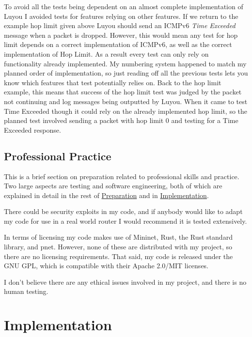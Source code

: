 \documentclass[12pt,a4paper,twoside,openright]{report}
\begin{document}
\bigskip

To avoid all the tests being dependent on an almost complete implementation of Luyou I avoided tests for features relying on other features. If we return to the example hop limit given above Luyou should send an ICMPv6 \textit{Time Exceeded} message when a packet is dropped.  However, this would mean any test for hop limit depends on a correct implementation of ICMPv6, as well as the correct implementation of Hop Limit.  As a result every test can only rely on functionality already implemented.  My numbering system happened to match my planned order of implementation, so just reading off all the previous tests lets you know which features that test potentially relies on.  Back to the hop limit example, this means that success of the hop limit test was judged by the packet not continuing and log messages being outputted by Luyou. When it came to test Time Exceeded though it could rely on the already implemented hop limit, so the planned test involved sending a packet with hop limit 0 and testing for a Time Exceeded response.

\section{Professional Practice}
This is a brief section on preparation related to professional skills and practice.  Two large aspects are testing and software engineering, both of which are explained in detail in the rest of \hyperref[chap::preparation]{Preparation} and in \hyperref[chap::implementation]{Implementation}.  

\bigskip

There could be security exploits in my code, and if anybody would like to adapt my code for use in a real world router I would recommend it is tested extensively.

\bigskip

In terms of licensing my code makes use of Mininet, Rust, the Rust standard library, and pnet.  However, none of these are distributed with my project, so there are no licensing requirements.  That said, my code is released under the GNU GPL\cite{gpl}, which is compatible with their Apache 2.0/MIT licenses.

\bigskip

I don't believe there are any ethical issues involved in my project, and there is no human testing.

\chapter{Implementation}
\label{chap::implementation}
\end{document}
